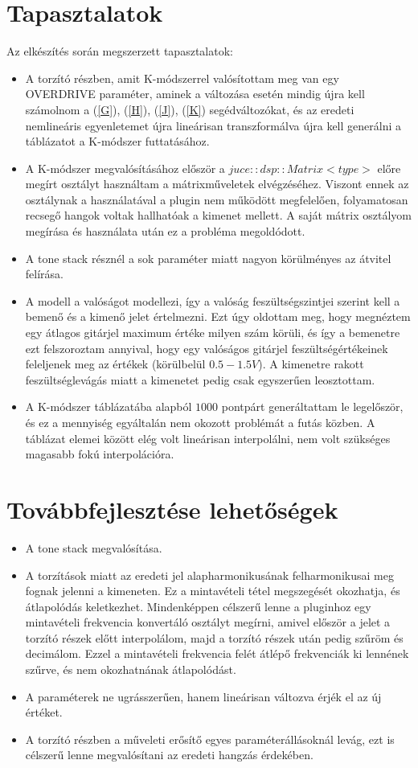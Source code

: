 \section{Tapasztalatok}
Az elkészítés során megszerzett tapasztalatok:
\begin{itemize}
    \item A torzító részben, amit K-módszerrel valósítottam meg van egy OVERDRIVE paraméter, aminek a változása esetén mindig újra kell számolnom a 
    (\ref{G}), (\ref{H}), (\ref{J}), (\ref{K}) segédváltozókat, és az eredeti nemlineáris egyenletemet újra lineárisan transzformálva újra kell generálni 
    a táblázatot a K-módszer futtatásához.
    \item A K-módszer megvalósításához először a $juce::dsp::Matrix<type>$ előre megírt osztályt használtam a mátrixműveletek elvégzéséhez. Viszont ennek az 
    osztálynak a használatával a plugin nem működött megfelelően, folyamatosan recsegő hangok voltak hallhatóak a kimenet mellett. A saját mátrix osztályom 
    megírása és használata után ez a probléma megoldódott.
    \item A tone stack résznél a sok paraméter miatt nagyon körülményes az átvitel felírása.
    \item A modell a valóságot modellezi, így a valóság feszültségszintjei szerint kell a bemenő és a kimenő jelet értelmezni. Ezt úgy oldottam meg, hogy megnéztem egy 
    átlagos gitárjel maximum értéke milyen szám körüli, és így a bemenetre ezt felszoroztam annyival, hogy egy valóságos gitárjel feszültségértékeinek feleljenek meg az értékek 
    (körülbelül $0.5-1.5V$). A kimenetre rakott feszültséglevágás miatt a kimenetet pedig csak egyszerűen leosztottam.
    \item A K-módszer táblázatába alapból $1000$ pontpárt generáltattam le legelőször, és ez a mennyiség egyáltalán nem okozott problémát a futás közben. A táblázat elemei között elég volt 
    lineárisan interpolálni, nem volt szükséges magasabb fokú interpolációra. 
\end{itemize}
\section{Továbbfejlesztése lehetőségek}
\begin{itemize}
    \item A tone stack megvalósítása.
    \item A torzítások miatt az eredeti jel alapharmonikusának felharmonikusai meg fognak jelenni a kimeneten. Ez a mintavételi tétel megszegését okozhatja, és átlapolódás keletkezhet. Mindenképpen célszerű lenne 
    a pluginhoz egy mintavételi frekvencia konvertáló osztályt megírni, amivel először a jelet a torzító részek előtt interpolálom, majd a torzító részek után pedig szűröm és decimálom. Ezzel a mintavételi frekvencia 
    felét átlépő frekvenciák ki lennének szűrve, és nem okozhatnának átlapolódást.
    \item A paraméterek ne ugrásszerűen, hanem lineárisan változva érjék el az új értéket.
    \item A torzító részben a műveleti erősítő egyes paraméterállásoknál levág, ezt is célszerű lenne megvalósítani az eredeti hangzás érdekében.
\end{itemize}